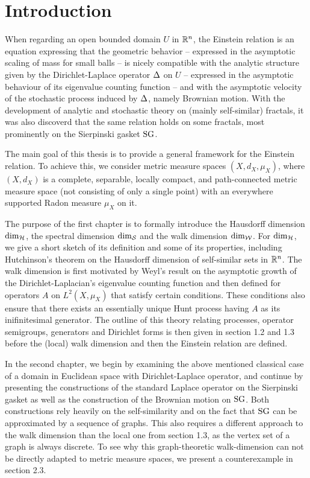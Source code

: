 \chapter*{Introduction}

When regarding an open bounded domain $U$ in $\mathbb{R}^n$, the Einstein relation is an equation expressing that the geometric behavior -- expressed in the asymptotic scaling of mass for small balls -- is nicely compatible with the analytic structure given by the Dirichlet-Laplace operator $\Delta$ on $U$ -- expressed in the asymptotic behaviour of its eigenvalue counting function -- and with the asymptotic velocity of the stochastic process induced by $\Delta$, namely Brownian motion. 
With the development of analytic and stochastic theory on (mainly self-similar) fractals, it was also discoverd that the same relation holds on some fractals, most prominently on the Sierpinski gasket $\operatorname{SG}$. 

The main goal of this thesis is to provide a general framework for the Einstein relation. To achieve this, we consider metric measure spaces $(X,d_X,\mu_X)$, where $(X,d_X)$ is a complete, separable, locally compact, and path-connected metric measure space (not consisting of only a single point) with an everywhere supported Radon measure $\mu_X$ on it. 

The purpose of the first chapter is to formally introduce the Hausdorff dimension $\dim_{\mathcal{H}}$, the spectral dimension $\dim_{\mathcal{S}}$ and the walk dimension $\dim_{\mathcal{W}}$. For $\dim_{\mathcal{H}}$, we give a short sketch of its definition and some of its properties, including Hutchinson's theorem on the Hausdorff dimension of self-similar sets in $\mathbb{R}^n$. The walk dimension is first motivated by Weyl's result on the asymptotic growth of the Dirichlet-Laplacian's eigenvalue counting function and then defined for operators $A$ on $L^2(X,\mu_X)$ that satisfy certain conditions. These conditions also ensure that there exists an essentially unique Hunt process having $A$ as its inifinitesimal generator. The outline of this theory relating processes, operator semigroups, generators and Dirichlet forms is then given in section 1.2 and 1.3 before the (local) walk dimension and then the Einstein relation are defined.

In the second chapter, we begin by examining the above mentioned classical case of a domain in Euclidean space with Dirichlet-Laplace operator, and continue by presenting the constructions of the standard Laplace operator on the Sierpinski gasket as well as the construction of the Brownian motion on $\operatorname{SG}$. Both constructions rely heavily on the self-similarity and on the fact that $\operatorname{SG}$ can be approximated by a sequence of graphs. This also requires a different approach to the walk dimension than the local one from section 1.3, as the vertex set of a graph is always discrete. To see why this graph-theoretic walk-dimension can not be directly adapted to metric measure spaces, we present a counterexample in section 2.3.

